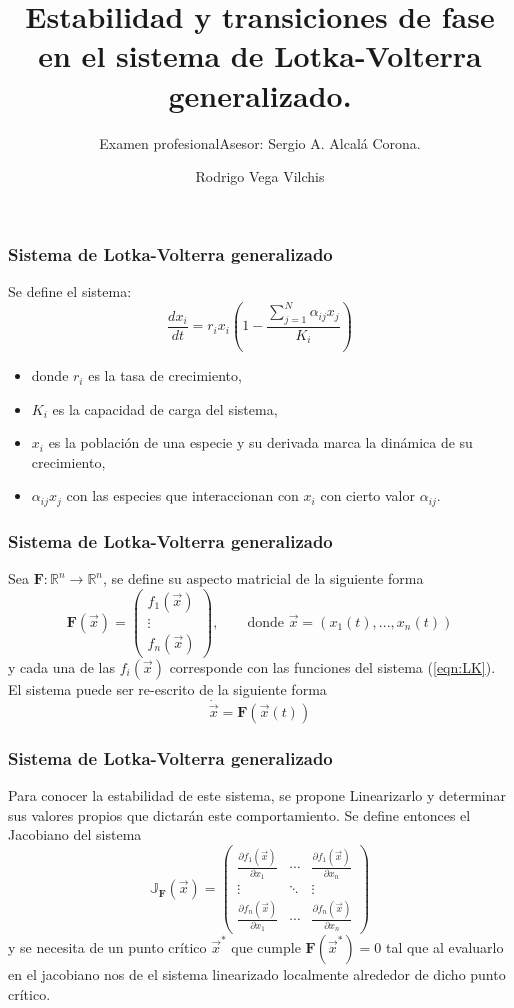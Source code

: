 \documentclass[10pt]{beamer}
\title[]
{
      \textbf{Estabilidad y transiciones de fase en el sistema de Lotka-Volterra generalizado.}
}
\subtitle[Tema o materia]
{Examen profesional}
\author[Autor]
{      Rodrigo Vega Vilchis
}
\subtitle{Asesor: Sergio A. Alcalá Corona.}
\institute[]
{
      \large{Facultad de Ciencias}\\
      Universidad Nacional Autónoma de México
  
}
\date{}
\begin{document}
\begin{frame}
  \frametitle{Sistema de Lotka-Volterra generalizado}
  Se define el sistema:
  \begin{equation}\label{eqn:LK}
  	\frac{dx_i}{dt}=r_ix_i\left(1-\frac{\sum_{j=1}^N\alpha_{ij}x_j}{K_i}\right)
  \end{equation}
  \begin{itemize}
  	\item donde $r_i$ es la tasa de crecimiento,
  	\item $K_i$ es la capacidad de carga del sistema,
  	\item $x_i$ es la población de una especie y su derivada marca la dinámica de su crecimiento,
  	\item $\alpha_{ij}x_j$ con las especies que interaccionan con $x_i$ con cierto valor $\alpha_{ij}$.
  \end{itemize}  
\end{frame}
\begin{frame}
  \frametitle{Sistema de Lotka-Volterra generalizado}
	  Sea $\textbf{F}:\mathbb{R}^n\to\mathbb{R}^n$, se define su aspecto matricial de la siguiente forma
	  $$\textbf{F}(\vec{x})=\begin{pmatrix}
	  	f_1(\vec{x})\\
	  	\vdots\\
	  	f_n(\vec{x})
	  \end{pmatrix},\qquad\text{donde }\vec{x}=(x_1(t),...,x_n(t))$$   
	  y cada una de las $f_i(\vec{x})$ corresponde con las funciones del sistema (\ref{eqn:LK}). El sistema puede ser re-escrito de la siguiente forma
	  $$\dot{\vec{x}}=\textbf{F}(\vec{x}(t))$$
\end{frame}
\begin{frame}
  \frametitle{Sistema de Lotka-Volterra generalizado}
  Para conocer la estabilidad de este sistema, se propone Linearizarlo y determinar sus valores propios que dictarán este comportamiento. Se define entonces el Jacobiano del sistema
  \begin{equation}
  	\mathbb{J}_{\textbf{F}}(\vec{x})=\begin{pmatrix}
  		\frac{\partial f_1(\vec{x})}{\partial x_1}&\cdots&\frac{\partial f_1(\vec{x})}{\partial x_n}\\
  		\vdots&\ddots&\vdots\\
  		\frac{\partial f_{n}(\vec{x})}{\partial x_1}&\cdots&\frac{\partial f_n(\vec{x})}{\partial x_n}
  	\end{pmatrix}
  \end{equation}  
  y se necesita de un punto crítico $\vec{x}^*$ que cumple $\textbf{F}(\vec{x}^*)=0$ tal que al evaluarlo en el jacobiano nos de el sistema linearizado localmente alrededor de dicho punto crítico.
\end{frame}
\end{document}

